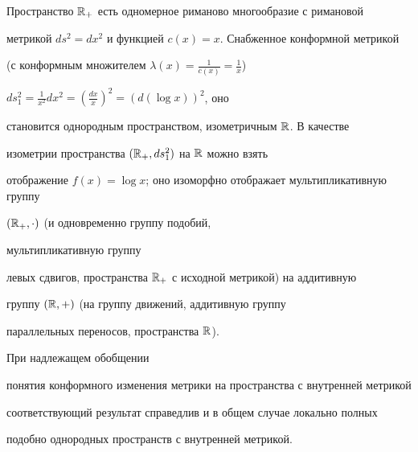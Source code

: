 Пространство $\Bbb{R}_{+}$ есть одномерное риманово многообразие с римановой


метрикой $ds^{2}=dx^{2}$ и функцией $c(x)=x$. Снабженное конформной метрикой


(с конформным множителем $\lambda(x)=\frac{1}{c(x)}=\frac{1}{x}$)


$ds^{2}_{1}=\frac{1}{x^{2}}dx^{2}=(\frac{dx}{x})^{2}=(d(\log x))^{2}$, оно


становится однородным пространством, изометричным $\Bbb{R}$. В качестве


изометрии пространства $(\Bbb{R}_{+}, ds^{2}_{1})$ на $\Bbb{R}$ можно взять


отображение $f(x)=\log x$; оно изоморфно отображает мультипликативную группу


$(\Bbb{R}_{+},\cdot)$ (и одновременно группу подобий,


мультипликативную группу


левых сдвигов, пространства $\Bbb{R}_{+}$ с исходной метрикой) на аддитивную


группу $(\Bbb{R},+)$ (на группу движений, аддитивную группу


параллельных переносов, пространства $\Bbb{R}$).





При надлежащем обобщении


понятия конформного изменения метрики на пространства с внутренней метрикой


соответствующий результат справедлив и в общем случае локально полных


подобно однородных пространств с внутренней метрикой.





